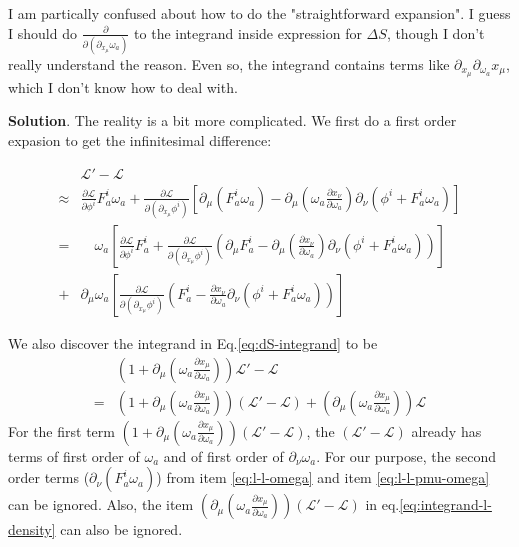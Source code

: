 \documentclass{article}
\begin{document}
I am partically confused about how to do the "straightforward expansion". I
guess I should do $\frac{\partial}{\partial (\partial_{x_\mu}\omega_a)}$ to the
integrand inside expression for $\Delta S$, though I don't really understand the
reason. Even so, the integrand contains terms like
$\partial_{x_\mu}\partial_{\omega_a}x_\mu$, which I don't know how to deal with.

\textbf{Solution}. The reality is a bit more complicated. We first do a first
order expasion to get the infinitesimal difference:

\begin{align}
    &\mathcal{L}'-\mathcal{L} \\
    \approx &
    \frac{\partial \mathcal{L}}{\partial\phi^i} F^i_a\omega_a
    +\frac{\partial \mathcal{L}}{\partial(\partial_{x_\mu}\phi^i)}
        \left[
        \partial_\mu\left(F^i_a\omega_a\right) 
            - \partial_\mu\left(\omega_a\frac{\partial x_\nu}{\partial\omega_a}\right)
                \partial_\nu\left(\phi^i+F^i_a\omega_a\right)
        \right]
    \nonumber\\
    =&\quad
    \omega_a
    \left[
        \frac{\partial \mathcal{L}}{\partial\phi^i}F^i_a 
        +
        \frac{\partial \mathcal{L}}{\partial(\partial_{x_\mu}\phi^i)}
        \left(
            \partial_\mu F^i_a 
            - \partial_\mu(\frac{\partial x_\nu}{\partial \omega_a})
            \partial_\nu(\phi^i+F^i_a\omega_a)
        \right)
    \right]
    \label{eq:l-l-omega}
    \\
    +&
    \partial_\mu\omega_a
    \left[
        \frac{\partial \mathcal{L}}{\partial(\partial_{x_\mu}\phi^i)}
        \left(
            F^i_a-\frac{\partial x_\nu}{\partial \omega_a}
            \partial_\nu(\phi^i+F^i_a\omega_a)
        \right)
    \right]
    \label{eq:l-l-pmu-omega}
\end{align}

We also discover the integrand in Eq.\ref{eq:dS-integrand} to be
\begin{align}
    &\left(1+\partial_\mu(
        \omega_a\frac{\partial x_\mu}{\partial \omega_a})
        \right)\mathcal{L}'-\mathcal{L} 
    \\
    =& 
    \left(
    1+\partial_\mu(\omega_a\frac{\partial x_\mu}{\partial \omega_a})
    \right)
    (\mathcal{L}'-\mathcal{L})
    +
    \left(\partial_\mu(\omega_a\frac{\partial x_\mu}{\partial \omega_a})\right)
    \mathcal{L}
    \label{eq:integrand-l-density}
\end{align}
For the first term 
$\left(
    1+\partial_\mu(\omega_a\frac{\partial x_\mu}{\partial \omega_a})
\right) (\mathcal{L}'-\mathcal{L}) $, the $(\mathcal{L}'-\mathcal{L})$ already
has terms of first order of $\omega_a$ and of first order of
$\partial_\nu\omega_a$. For our purpose, the second order terms
($\partial_\nu(F^i_a\omega_a)$) from item \ref{eq:l-l-omega} and item
\ref{eq:l-l-pmu-omega} can be ignored. Also, the item
$(\partial_\mu(\omega_a\frac{\partial x_\mu}{\partial
\omega_a}))(\mathcal{L}'-\mathcal{L})$ in eq.\ref{eq:integrand-l-density} can
also be ignored.
\end{document}
